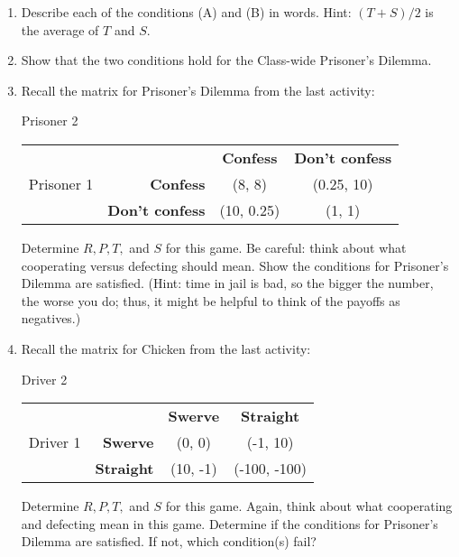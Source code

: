 \begin{enumerate}
\item Describe each of the conditions (A) and (B) in words. Hint: $(T+S)/2$ is the average of $T$ and $S$.
\item Show that the two conditions hold for the Class-wide Prisoner's Dilemma.

\item Recall the matrix for Prisoner's Dilemma from the last activity:

 \hspace{3in}Prisoner 2

\begin{center}
\begin{tabular}{l|r|c|c|}\cline{2-4}
&&\textbf{Confess}&\textbf{Don't confess}\\ \cline{2-4}
Prisoner 1&\textbf{Confess} &(8, 8)&(0.25, 10)\\ \cline{2-4}
&\textbf{Don't confess} &(10, 0.25)&(1, 1)\\ \cline{2-4}
\end{tabular}
\end{center}
\vspace{.1in}
Determine $R, P, T,$ and $S$ for this game. Be careful: think about what cooperating versus defecting should mean. Show the conditions for Prisoner's Dilemma are satisfied. (Hint: time in jail is bad, so the bigger the number, the worse you do; thus, it might be helpful to think of the payoffs as negatives.)

\item Recall the matrix for Chicken from the last activity:

\hspace{3in}Driver 2

\begin{center}
\begin{tabular}{l|r|c|c|}\cline{2-4}
&&\textbf{Swerve}&\textbf{Straight}\\ \cline{2-4}
Driver 1&\textbf{Swerve} &(0, 0)&(-1, 10)\\ \cline{2-4}
&\textbf{Straight} &(10, -1)&(-100, -100)\\ \cline{2-4}
\end{tabular}
\end{center}
\vspace{.1in}
Determine $R, P, T,$ and $S$ for this game. Again, think about what cooperating and defecting mean in this game. Determine if the conditions for Prisoner's Dilemma are satisfied. If not, which condition(s) fail?


\end{enumerate}
